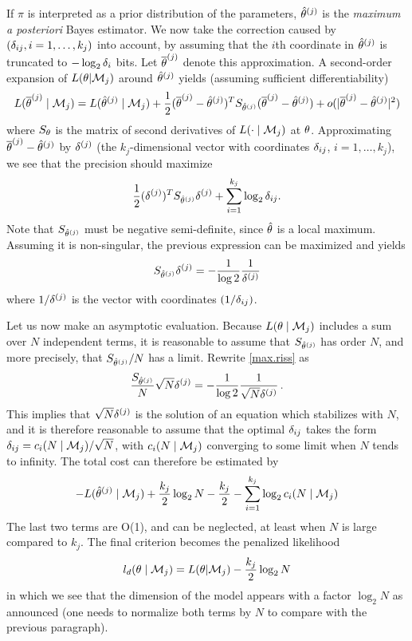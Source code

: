 If $\pi$ is interpreted as a prior distribution of the parameters,
${\hat{\theta}}^{(j)}$ is the {\em maximum a posteriori} Bayes estimator. We now take
the correction caused by 
$(\delta_{ij}, i=1, \ldots, k_j)$ into account, by assuming that the $i$th coordinate in ${\hat{\theta}}^{(j)}$
is truncated to  $-\log_2 \delta_i$ bits. Let
$\overline{\theta}^{(j)}$ denote this approximation. A second-order expansion of
$L(\theta|{\mathcal M}_j)$ around ${\hat{\theta}}^{(j)}$ yields (assuming sufficient differentiability) 
$$
L(\overline{\theta}^{(j)}\mid {\mathcal M}_j) = L({\hat{\theta}}^{(j)}\mid {\mathcal M}_j) + \frac{1}{2} (\overline{\theta}^{(j)} - {\hat{\theta}}^{(j)})^T S_{{\hat{\theta}}^{(j)}}
(\overline{\theta}^{(j)} - {\hat{\theta}}^{(j)}) + o(|\overline{\theta}^{(j)}- {\hat{\theta}}^{(j)}|^2)
$$
where $S_\theta$ is the matrix of second derivatives of  $L(\cdot\mid {\mathcal M}_j)$ at
$\theta$. Approximating $\overline{\theta}^{(j)} - {\hat{\theta}}^{(j)}$ by $\delta^{(j)}$ (the
$k_j$-dimensional vector with coordinates $\delta_{ij}$, $i=1, \ldots, k_j$), we see that the precision
should maximize
$$
\frac{1}{2} (\delta^{(j)})^T S_{{\hat{\theta}}^{(j)}} \delta^{(j)} + \sum_{i=1}^{k_j} \log_2\delta_{ij}.
$$
Note that $S_{{\hat{\theta}}^{(j)}}$ must be negative semi-definite, since ${\hat{\theta}}$ is a
local maximum. Assuming it is non-singular, the previous
expression can be maximized and yields
\begin{equation}
\label{max.riss}
S_{{\hat{\theta}}^{(j)}} \delta^{(j)} = -\frac{1}{\log 2} \frac{1}{\delta^{(j)}}
\end{equation}
where $1/\delta^{(j)}$ is the vector with coordinates $(1/\delta_{ij})$.

Let us now make an asymptotic evaluation. Because  $L(\theta\mid {\mathcal M}_j)$
includes a sum over $N$ independent terms, it is reasonable to assume that $S_{{\hat{\theta}}^{(j)}}$ has order
$N$, and more precisely, that $S_{{\hat{\theta}}^{(j)}}/N$ has a limit. Rewrite
 \cref{max.riss} as
$$
\frac{S_{{\hat{\theta}}^{(j)}}}{N} {\sqrt{N}\delta^{(j)}} = -\frac{1}{\log 2} \frac{1}{\sqrt{N}\delta^{(j)}}\,.
$$
This implies that $\sqrt{N}\delta^{(j)}$ is the solution of an equation which
stabilizes with $N$, and it is therefore reasonable to assume that the optimal $\delta_{ij}$ takes the form $\delta_{ij} =
c_i(N\mid {\mathcal M}_j)/\sqrt{N}$, with $c_i(N\mid {\mathcal M}_j)$ converging to some limit when $N$ tends
to infinity. The total cost can therefore be estimated by
$$
- L({\hat{\theta}}^{(j)}\mid {\mathcal M}_j) + \frac{k_j}{2} \log_2 N - \frac{k_j}{2} - \sum_{i=1}^{k_j} \log_2 c_i(N\mid {\mathcal M}_j)
$$
The last two terms are O(1), and can be neglected, at least when $N$
is large compared to $k_j$. The final criterion becomes the
penalized likelihood
$$
l_d(\theta\mid {\mathcal M}_j) = L(\theta|{\mathcal M}_j) - \frac{k_j}{2} \log_2 N
$$
in which we see that the dimension of the model appears with a factor
$\log_2N$ as announced (one needs to normalize both terms by $N$ to
compare with the previous paragraph). 

